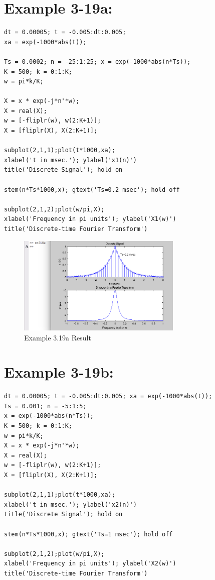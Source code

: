 \documentclass[11pt
  , a4paper
  , article
  , oneside
]{memoir}
\begin{document}
\chapter{Example 3-19a:}

\begin{lstlisting}[style=termstyle]
% Example 3.19a
dt = 0.00005; t = -0.005:dt:0.005; 
xa = exp(-1000*abs(t));

Ts = 0.0002; n = -25:1:25; x = exp(-1000*abs(n*Ts));
K = 500; k = 0:1:K;
w = pi*k/K;

X = x * exp(-j*n'*w);
X = real(X);
w = [-fliplr(w), w(2:K+1)];
X = [fliplr(X), X(2:K+1)];

subplot(2,1,1);plot(t*1000,xa);
xlabel('t in msec.'); ylabel('x1(n)')
title('Discrete Signal'); hold on

stem(n*Ts*1000,x); gtext('Ts=0.2 msec'); hold off

subplot(2,1,2);plot(w/pi,X);
xlabel('Frequency in pi units'); ylabel('X1(w)')
title('Discrete-time Fourier Transform')
\end{lstlisting}

\clearpage

\begin{figure}[h!]
	\centering
	\includegraphics[width=0.7\textwidth,height=0.5\textwidth]{./images/ex319a.png}
	\caption{Example 3.19a Result}
	\label{fig:Example 3-19a Result}
\end{figure}

\clearpage

\chapter{Example 3-19b:}
\begin{lstlisting}[style=termstyle]
% Example 3.19b
dt = 0.00005; t = -0.005:dt:0.005; xa = exp(-1000*abs(t));
Ts = 0.001; n = -5:1:5;
x = exp(-1000*abs(n*Ts));
K = 500; k = 0:1:K;
w = pi*k/K;
X = x * exp(-j*n'*w);
X = real(X);
w = [-fliplr(w), w(2:K+1)];
X = [fliplr(X), X(2:K+1)];

subplot(2,1,1);plot(t*1000,xa);
xlabel('t in msec.'); ylabel('x2(n)')
title('Discrete Signal'); hold on

stem(n*Ts*1000,x); gtext('Ts=1 msec'); hold off

subplot(2,1,2);plot(w/pi,X);
xlabel('Frequency in pi units'); ylabel('X2(w)')
title('Discrete-time Fourier Transform')
\end{lstlisting}
\end{document}
